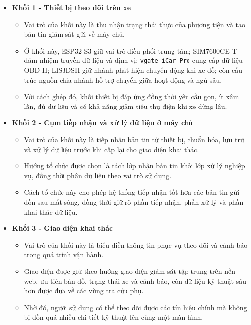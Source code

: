 \documentclass[a4paper]{extarticle}
\providecommand{\tightlist}{%
  \setlength{\itemsep}{0pt}\setlength{\parskip}{0pt}}
\begin{document}
\begin{itemize}
\tightlist
\item
  \textbf{Khối 1 - Thiết bị theo dõi trên xe}

  \begin{itemize}
  \tightlist
  \item
    Vai trò của khối này là thu nhận trạng thái thực của phương tiện và tạo bản tin giám sát gửi về máy chủ.
  \item
    Ở khối này, ESP32-S3 giữ vai trò điều phối trung tâm; SIM7600CE-T đảm nhiệm truyền dữ liệu và định vị; \texttt{vgate\ iCar\ Pro} cung cấp dữ liệu OBD-II; LIS3DSH giữ nhánh phát hiện chuyển động khi xe đỗ; còn cấu trúc nguồn chia nhánh hỗ trợ chuyển giữa hoạt động và ngủ sâu.
  \item
    Với cách ghép đó, khối thiết bị đáp ứng đồng thời yêu cầu gọn, ít xâm lấn, đủ dữ liệu và có khả năng giảm tiêu thụ điện khi xe dừng lâu.
  \end{itemize}
\item
  \textbf{Khối 2 - Cụm tiếp nhận và xử lý dữ liệu ở máy chủ}

  \begin{itemize}
  \tightlist
  \item
    Vai trò của khối này là tiếp nhận bản tin từ thiết bị, chuẩn hóa, lưu trữ và xử lý dữ liệu trước khi cấp lại cho giao diện khai thác.
  \item
    Hướng tổ chức được chọn là tách lớp nhận bản tin khỏi lớp xử lý nghiệp vụ, đồng thời phân dữ liệu theo vai trò sử dụng.
  \item
    Cách tổ chức này cho phép hệ thống tiếp nhận tốt hơn các bản tin gửi dồn sau mất sóng, đồng thời giữ rõ phần tiếp nhận, phần xử lý và phần khai thác dữ liệu.
  \end{itemize}
\item
  \textbf{Khối 3 - Giao diện khai thác}

  \begin{itemize}
  \tightlist
  \item
    Vai trò của khối này là biểu diễn thông tin phục vụ theo dõi và cảnh báo trong quá trình vận hành.
  \item
    Giao diện được giữ theo hướng giao diện giám sát tập trung trên nền web, ưu tiên bản đồ, trạng thái xe và cảnh báo, còn dữ liệu kỹ thuật sâu hơn được đưa về các vùng tra cứu phụ.
  \item
    Nhờ đó, người sử dụng có thể theo dõi được các tín hiệu chính mà không bị dồn quá nhiều chi tiết kỹ thuật lên cùng một màn hình.
  \end{itemize}
\end{itemize}
\end{document}
